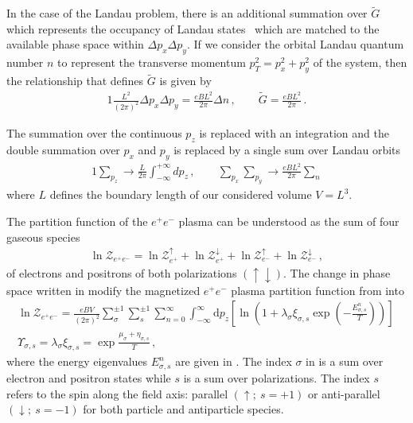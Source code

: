 In the case of the Landau problem, there is an additional summation over $\widetilde{G}$ which represents the occupancy of Landau states~\citep{greiner2012thermodynamics} which are matched to the available phase space within $\Delta p_{x}\Delta p_{y}$. If we consider the orbital Landau quantum number $n$ to represent the transverse momentum $p_{T}^{2}=p_{x}^{2}+p_{y}^{2}$ of the system, then the relationship that defines $\widetilde{G}$ is given by
\begin{alignat}{1}
    \label{phase:1} \frac{L^{2}}{(2\pi)^{2}}\Delta p_{x}\Delta p_{y}=\frac{eBL^{2}}{2\pi}\Delta n\,,\qquad\widetilde{G}=\frac{eBL^{2}}{2\pi}\,.
\end{alignat}

The summation over the continuous $p_{z}$ is replaced with an integration and the double summation over $p_{x}$ and $p_{y}$ is replaced by a single sum over Landau orbits
\begin{alignat}{1}
    \label{phase:2}
    \sum_{p_{z}}\rightarrow\frac{L}{2\pi}\int^{+\infty}_{-\infty}dp_{z}\,,\qquad\sum_{p_{x}}\sum_{p_{y}}\rightarrow\frac{eBL^{2}}{2\pi}\sum_{n}
\end{alignat}
where $L$ defines the boundary length of our considered volume $V=L^{3}$.

The partition function of the $e^{+}e^{-}$ plasma can be understood as the sum of four gaseous species
\begin{align}
    \label{partition:0}    
    \ln\mathcal{Z}_{e^{+}e^{-}}=\ln\mathcal{Z}_{e^{+}}^{\uparrow}+\ln\mathcal{Z}_{e^{+}}^{\downarrow}+\ln\mathcal{Z}_{e^{-}}^{\uparrow}+\ln\mathcal{Z}_{e^{-}}^{\downarrow}\,,
\end{align}
of electrons and positrons of both polarizations $(\uparrow\downarrow)$. The change in phase space written in  modify the magnetized $e^{+}e^{-}$ plasma partition function from  into
\begin{gather}
     \label{partition:1}
     \ln\mathcal{Z}_{e^{+}e^{-}}=\frac{e{B}V}{(2\pi)^{2}}\sum_{\sigma}^{\pm1}\sum_{s}^{\pm1}\sum_{n=0}^{\infty}\int_{-\infty}^{\infty}\mathrm{d}p_{z}\left[\ln\left(1+\lambda_{\sigma}\xi_{\sigma,s}\exp\left(-\frac{E_{\sigma,s}^{n}}{T}\right)\right)\right]\,\\
    \label{partition:2}    
    \Upsilon_{\sigma,s} =\lambda_{\sigma}\xi_{\sigma,s} = \exp{\frac{\mu_{\sigma}+\eta_{\sigma,s}}{T}}\,,
\end{gather}
where the energy eigenvalues $E_{\sigma,s}^{n}$ are given in . The index $\sigma$ in  is a sum over electron and positron states while $s$ is a sum over polarizations. The index $s$ refers to the spin along the field axis: parallel $(\uparrow;\ s=+1)$ or anti-parallel $(\downarrow;\ s=-1)$ for both particle and antiparticle species.

